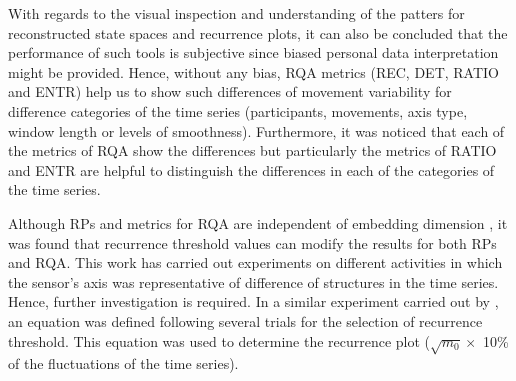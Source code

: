 With regards to the visual inspection and understanding of the patters
for reconstructed state spaces and recurrence plots,
it can also be concluded that the performance of such tools is subjective 
since biased personal data interpretation might be provided.
Hence, without any bias, RQA metrics (REC, DET, RATIO and ENTR) help us to show 
such differences of movement variability for difference categories 
of the time series (participants, movements, axis type, window length or levels of smoothness).
Furthermore, it was noticed that each of the metrics of RQA show the differences 
but particularly the metrics of RATIO and ENTR are helpful to distinguish 
the differences in each of the categories of the time series.

Although RPs and metrics for RQA are independent of embedding dimension \cite{iwanski1998},
it was found that recurrence threshold values can modify the results for both RPs and RQA.
This work has carried out experiments on different activities in which 
the sensor's axis was representative of difference of structures in the time series.
Hence, further investigation is required.
In a similar experiment carried out by \cite{letellier2006}, an equation was defined following 
several trials for the selection of recurrence threshold. 
This equation was used to determine the recurrence plot 
($\sqrt{m_0} \times$ 10\% of the fluctuations of the time series).



